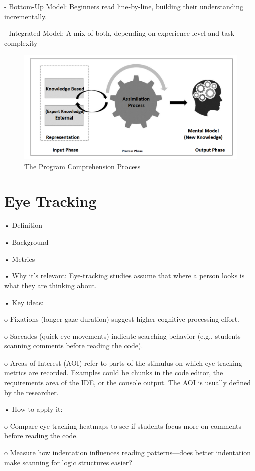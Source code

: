 - Bottom-Up Model: Beginners read line-by-line, building their understanding incrementally.

- Integrated Model: A mix of both, depending on experience level and task complexity


\begin{figure} [h!]
  \centering
  \includegraphics[width=\textwidth]{figures/program_Comprehension_Process.png}
  \caption{The Program Comprehension Process}
  \label{fig:AnhangsChor}
\end{figure}

\section{Eye Tracking}

•	Definition 


•	Background


•	Metrics


•	Why it’s relevant: Eye-tracking studies assume that where a person looks is what they are thinking about.


•	Key ideas:


o	Fixations (longer gaze duration) suggest higher cognitive processing effort.


o	Saccades (quick eye movements) indicate searching behavior (e.g., students scanning comments before reading the code).


o	Areas of Interest (AOI) refer to parts of the stimulus on which eye-tracking metrics are recorded. Examples could be chunks in the code editor, the requirements area of the IDE, or the console output. The AOI is usually defined by the researcher.


•	How to apply it:


o	Compare eye-tracking heatmaps to see if students focus more on comments before reading the code.


o	Measure how indentation influences reading patterns—does better indentation make scanning for logic structures easier?


